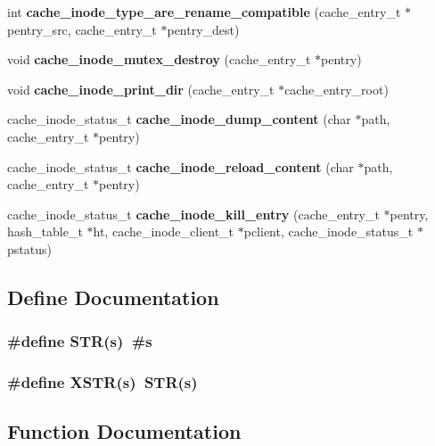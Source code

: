 \begin{DoxyCompactItemize}
int {\bf cache\_\-inode\_\-type\_\-are\_\-rename\_\-compatible} (cache\_\-entry\_\-t $\ast$pentry\_\-src, cache\_\-entry\_\-t $\ast$pentry\_\-dest)
\item 
void {\bf cache\_\-inode\_\-mutex\_\-destroy} (cache\_\-entry\_\-t $\ast$pentry)
\item 
void {\bf cache\_\-inode\_\-print\_\-dir} (cache\_\-entry\_\-t $\ast$cache\_\-entry\_\-root)
\item 
cache\_\-inode\_\-status\_\-t {\bf cache\_\-inode\_\-dump\_\-content} (char $\ast$path, cache\_\-entry\_\-t $\ast$pentry)
\item 
cache\_\-inode\_\-status\_\-t {\bf cache\_\-inode\_\-reload\_\-content} (char $\ast$path, cache\_\-entry\_\-t $\ast$pentry)
\item 
cache\_\-inode\_\-status\_\-t {\bf cache\_\-inode\_\-kill\_\-entry} (cache\_\-entry\_\-t $\ast$pentry, hash\_\-table\_\-t $\ast$ht, cache\_\-inode\_\-client\_\-t $\ast$pclient, cache\_\-inode\_\-status\_\-t $\ast$pstatus)
\end{DoxyCompactItemize}


\subsection{Define Documentation}
\subsubsection[{STR}]{\setlength{\rightskip}{0pt plus 5cm}\#define STR(s)~\#s}\label{cache__inode__misc_8c_a6388870e639eee9c0a69446876f1f8cc}
\subsubsection[{XSTR}]{\setlength{\rightskip}{0pt plus 5cm}\#define XSTR(s)~STR(s)}\label{cache__inode__misc_8c_a03943706e48069237cd57f2d35ca987e}


\subsection{Function Documentation}
